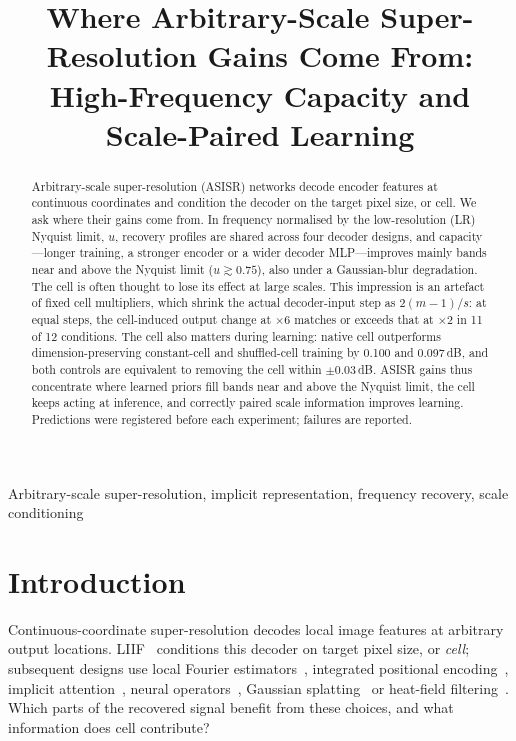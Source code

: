 \documentclass{article}
\title{Where Arbitrary-Scale Super-Resolution Gains Come From:\\
High-Frequency Capacity and Scale-Paired Learning}
\begin{document}
\maketitle

\begin{abstract}
Arbitrary-scale super-resolution (ASISR) networks decode encoder features at continuous coordinates and condition the decoder on the target pixel size, or cell. We ask where their gains come from. In frequency normalised by the low-resolution (LR) Nyquist limit, $u$, recovery profiles are shared across four decoder designs, and capacity---longer training, a stronger encoder or a wider decoder MLP---improves mainly bands near and above the Nyquist limit ($u\gtrsim0.75$), also under a Gaussian-blur degradation. The cell is often thought to lose its effect at large scales. This impression is an artefact of fixed cell multipliers, which shrink the actual decoder-input step as $2(m-1)/s$: at equal steps, the cell-induced output change at $\times6$ matches or exceeds that at $\times2$ in 11 of 12 conditions. The cell also matters during learning: native cell outperforms dimension-preserving constant-cell and shuffled-cell training by 0.100 and 0.097\,dB, and both controls are equivalent to removing the cell within $\pm0.03$\,dB. ASISR gains thus concentrate where learned priors fill bands near and above the Nyquist limit, the cell keeps acting at inference, and correctly paired scale information improves learning. Predictions were registered before each experiment; failures are reported.
\end{abstract}
\begin{keywords}
Arbitrary-scale super-resolution, implicit representation, frequency recovery, scale conditioning
\end{keywords}

\section{Introduction}
\label{sec:intro}
Continuous-coordinate super-resolution decodes local image features at arbitrary output locations. LIIF~\cite{chen2021liif} conditions this decoder on target pixel size, or \emph{cell}; subsequent designs use local Fourier estimators~\cite{lee2022lte}, integrated positional encoding~\cite{liu2021ipe}, implicit attention~\cite{cao2023ciaosr}, neural operators~\cite{wei2023srno}, Gaussian splatting~\cite{hu2024gaussiansr} or heat-field filtering~\cite{becker2025thera}. Which parts of the recovered signal benefit from these choices, and what information does cell contribute?
\end{document}

